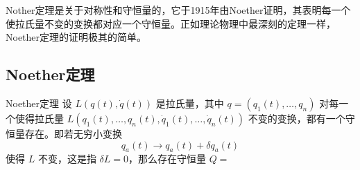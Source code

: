 
Nother定理是关于对称性和守恒量的，它于1915年由Noether证明，其表明每一个使拉氏量不变的变换都对应一个守恒量。正如理论物理中最深刻的定理一样，Noether定理的证明极其的简单。

\subsection{Noether定理}
\begin{theorem}{Noether定理}
设 $L(q(t),\dot q(t))$ 是拉氏量，其中 $q=(q_1(t),\ldots,q_n)$ 对每一个使得拉氏量 $L(q_1(t),\ldots,q_n(t),\dot q_1(t),\ldots,\dot q_n(t))$ 不变的变换，都有一个守恒量存在。即若无穷小变换
\begin{equation}
q_a(t)\rightarrow q_a(t)+\delta q_a(t)
\end{equation}
使得 $L$ 不变，这是指 $\delta L=0$，那么存在守恒量 $Q=$

\end{theorem}
